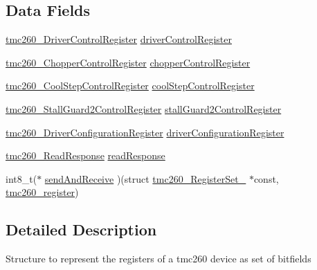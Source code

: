 \subsection*{Data Fields}
\begin{DoxyCompactItemize}
\item 
\mbox{\hyperlink{tmc260__driver_8h_a42b84b84bc4d9625475d9ec4ed84b568}{tmc260\+\_\+\+Driver\+Control\+Register}} \mbox{\hyperlink{structtmc260___register_set___a9e19dca084d9d1634694f883273cd190}{driver\+Control\+Register}}
\item 
\mbox{\hyperlink{tmc260__driver_8h_ad9441788a191da34195daab49d56df8d}{tmc260\+\_\+\+Chopper\+Control\+Register}} \mbox{\hyperlink{structtmc260___register_set___a4f7b5272bed27e5dbdcb1e49a678a387}{chopper\+Control\+Register}}
\item 
\mbox{\hyperlink{tmc260__driver_8h_a7cfa3ad8edba4fb6683885768a43f4f4}{tmc260\+\_\+\+Cool\+Step\+Control\+Register}} \mbox{\hyperlink{structtmc260___register_set___a74101eb9a3ef24d4d5342c46ba1a2b0c}{cool\+Step\+Control\+Register}}
\item 
\mbox{\hyperlink{tmc260__driver_8h_afa0a9cd31ee349e1fea8ff665665ad45}{tmc260\+\_\+\+Stall\+Guard2\+Control\+Register}} \mbox{\hyperlink{structtmc260___register_set___a259edf50b3ce148e4cee8d78134f021b}{stall\+Guard2\+Control\+Register}}
\item 
\mbox{\hyperlink{tmc260__driver_8h_abfbbe7f0019af5812f509ef9866d375b}{tmc260\+\_\+\+Driver\+Configuration\+Register}} \mbox{\hyperlink{structtmc260___register_set___a83f35892c401a44390f622a14a1b5997}{driver\+Configuration\+Register}}
\item 
\mbox{\hyperlink{tmc260__driver_8h_a09ad0d94646027ff63c22456ac9c2436}{tmc260\+\_\+\+Read\+Response}} \mbox{\hyperlink{structtmc260___register_set___af5aca622350ed83f1c856817fb63b3c7}{read\+Response}}
\item 
int8\+\_\+t($\ast$ \mbox{\hyperlink{structtmc260___register_set___a00c49dc180ca3af071fe44406cde7d84}{send\+And\+Receive}} )(struct \mbox{\hyperlink{structtmc260___register_set__}{tmc260\+\_\+\+Register\+Set\+\_\+}} $\ast$const, \mbox{\hyperlink{tmc260__driver_8h_a4552d2ee758c08501723a6dc78d26dc7}{tmc260\+\_\+register}})
\end{DoxyCompactItemize}


\subsection{Detailed Description}
Structure to represent the registers of a tmc260 device as set of bitfields 

